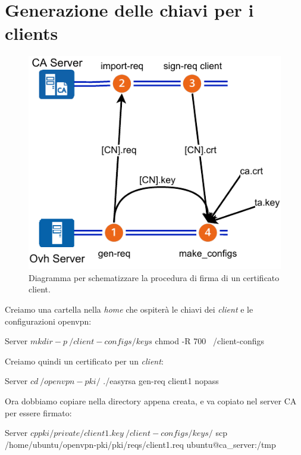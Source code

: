 

\section{Generazione delle chiavi per i clients}
\label{sec:client_keys}

\begin{figure}[H]
    \centering
    \includegraphics[width=0.6\linewidth]{immagini/diag-firma_certificato_client}
    \caption{Diagramma per schematizzare la procedura di firma di un certificato client.}
    \label{fig:diag-firma_certificato_client}
\end{figure}


Creiamo una cartella nella \textit{home} che ospiterà le chiavi dei \textit{client} e le configurazioni openvpn:

\begin{bashcode}{Server}{}
$ mkdir -p ~/client-configs/keys
$ chmod -R 700 ~/client-configs
\end{bashcode}

Creiamo quindi un certificato per un \textit{client}:

\begin{bashcode}{Server}{}
$ cd ~/openvpn-pki/
$ ./easyrsa gen-req client1 nopass
\end{bashcode}

Ora dobbiamo copiare  nella directory appena creata, e  va copiato nel server CA per essere firmato:

\begin{bashcode}{Server}{}
$ cp pki/private/client1.key ~/client-configs/keys/
$ scp /home/ubuntu/openvpn-pki/pki/reqs/client1.req ubuntu@ca_server:/tmp
\end{bashcode}

